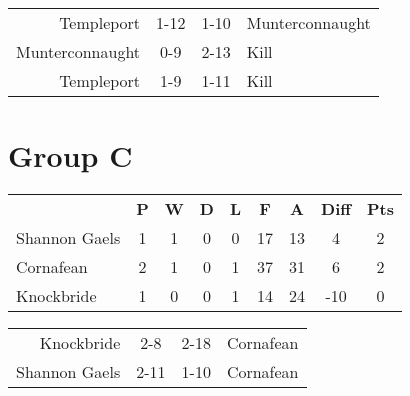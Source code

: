 \documentclass[11pt,a4paper]{article}
\begin{document}
\vspace{10 mm}

\begin{tabular}{rccl}
Templeport & 1-12 & 1-10 & Munterconnaught \\
Munterconnaught & 0-9 & 2-13 & Kill \\
Templeport & 1-9 & 1-11 & Kill \\
\end{tabular}

\section*{Group C}

\begin{tabular}{lcccccccc}
 & \textbf{P} & \textbf{W} & \textbf{D} & \textbf{L} & \textbf{F} & \textbf{A} & \textbf{Diff} & \textbf{Pts} \\
Shannon Gaels & 1 & 1 & 0 & 0 & 17 & 13 & 4 & 2 \\
Cornafean & 2 & 1 & 0 & 1 & 37 & 31 & 6 & 2 \\
Knockbride & 1 & 0 & 0 & 1 & 14 & 24 & -10 & 0 \\
\end{tabular}

\vspace{10 mm}

\begin{tabular}{rccl}
Knockbride & 2-8 & 2-18 & Cornafean \\
Shannon Gaels & 2-11 & 1-10 & Cornafean \\
\end{tabular}
\end{document}
